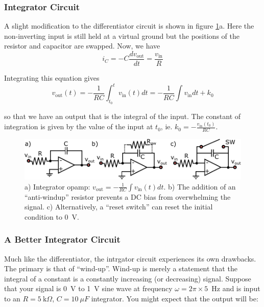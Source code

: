 \documentclass[]{article}
\begin{document}
\subsubsection{Integrator Circuit}
A slight modification to the differentiator circuit is shown in figure \ref{fig:integrator_opamp}a. Here the non-inverting input is still held at a virtual ground but the positions of the resistor and capacitor are swapped. Now, we have
$$
i_C = -C\frac{dv_\text{out}}{dt} = \frac{v_\text{in}}{R}
$$

Integrating this equation gives
\begin{equation}
\label{eq:opamp_integrator}
v_\text{out}(t) = -\frac{1}{RC}\int_{t_0}^{t}v_\text{in}(t)dt =  -\frac{1}{RC}\int v_\text{in}dt + k_0
\end{equation}

\noindent so that we have an output that is the integral of the input. The constant of integration is given by the value of the input at $t_0$, ie. $k_0 = -\frac{v_\text{in}(t_0)}{RC}$.

\begin{figure}[ht]
\caption{a) Integrator opamp: $v_\text{out} = -\frac{1}{RC}\int v_\text{in}(t)dt$. b) The addition of an ``anti-windup'' resistor prevents a DC bias from overwhelming the signal. c) Alternatively, a ``reset switch'' can reset the initial condition to 0~V.}
\label{fig:integrator_opamp}
	\begin{center}
		\includegraphics[width = \textwidth]{Images/integrator_opamp.pdf}
	\end{center}
\end{figure}

\subsubsection{A Better Integrator Circuit}
Much like the differentiator, the intrgator circuit experiences its own drawbacks. The primary is that of ``wind-up''. Wind-up is merely a statement that the integral of a constant is a constantly increasing (or decreasing) signal. Suppose that your signal is 0~V to 1~V sine wave at frequency $\omega = 2\pi\times5$~Hz and is input to an $R =  5~\text{k}\Omega$, $C = 10~\mu F$ integrator. You might expect that the output will be:
\end{document}
